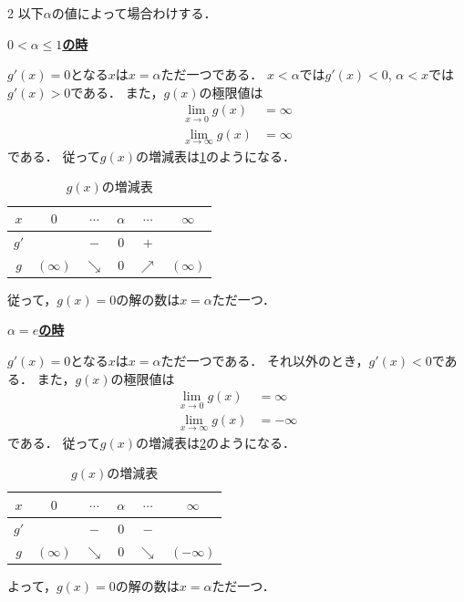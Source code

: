 \documentclass[../../main.tex]{subfiles}
\begin{document}
\begin{multicols}{2}
  以下$\alpha$の値によって場合わけする．

  \underline{\textbf{$0<\alpha\le 1$の時}}

  $g'(x) = 0$となる$x$は$x=\alpha$ただ一つである．
  $x<\alpha$では$g'(x)<0$, $\alpha<x$では$g'(x)>0$である．
  また，$g(x)$の極限値は
  \begin{align}
    \lim_{x\to 0} g(x)      & = \infty \\
    \lim_{x\to \infty} g(x) & = \infty
  \end{align}
  である．
  従って$g(x)$の増減表は\cref{2010-2:table:3}のようになる．
  \begin{table}[H]
    \centering
    \caption{$g(x)$の増減表}
    \label{2010-2:table:3}
    \begin{tabular}{|c||c|c|c|c|c|}
      \hline
      $x$  & $0$        & $\cdots$   & $\alpha$ & $\cdots$   & $\infty$   \\
      \hline
      $g'$ &            & $-$        & $0$      & $+$        &            \\
      \hline
      $g$  & $(\infty)$ & $\searrow$ & $0$      & $\nearrow$ & $(\infty)$ \\
      \hline
    \end{tabular}
  \end{table}

  従って，$g(x)=0$の解の数は$x=\alpha$ただ一つ．

  \underline{\textbf{$\alpha= e$の時}}

  $g'(x) = 0$となる$x$は$x=\alpha$ただ一つである．
  それ以外のとき，$g'(x)<0$である．
  また，$g(x)$の極限値は
  \begin{align}
    \lim_{x\to 0} g(x)      & = \infty  \\
    \lim_{x\to \infty} g(x) & = -\infty
  \end{align}
  である．
  従って$g(x)$の増減表は\cref{2010-2:table:4}のようになる．
  \begin{table}[H]
    \centering
    \caption{$g(x)$の増減表}
    \label{2010-2:table:4}
    \begin{tabular}{|c||c|c|c|c|c|}
      \hline
      $x$  & $0$        & $\cdots$   & $\alpha$ & $\cdots$   & $\infty$    \\
      \hline
      $g'$ &            & $-$        & $0$      & $-$        &             \\
      \hline
      $g$  & $(\infty)$ & $\searrow$ & $0$      & $\searrow$ & $(-\infty)$ \\
      \hline
    \end{tabular}
  \end{table}
  よって，$g(x)=0$の解の数は$x=\alpha$ただ一つ．


\end{multicols}
\end{document}
